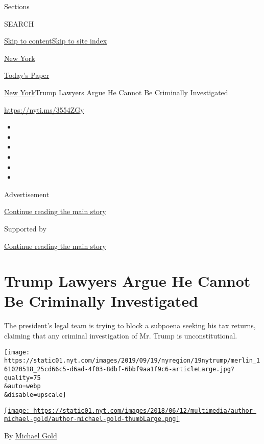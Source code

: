 Sections

SEARCH

\protect\hyperlink{site-content}{Skip to
content}\protect\hyperlink{site-index}{Skip to site index}

\href{https://www.nytimes.com/section/nyregion}{New York}

\href{https://myaccount.nytimes.com/auth/login?response_type=cookie\&client_id=vi}{}

\href{https://www.nytimes.com/section/todayspaper}{Today's Paper}

\href{/section/nyregion}{New York}\textbar{}Trump Lawyers Argue He
Cannot Be Criminally Investigated

\url{https://nyti.ms/3554ZGy}

\begin{itemize}
\item
\item
\item
\item
\item
\item
\end{itemize}

Advertisement

\protect\hyperlink{after-top}{Continue reading the main story}

Supported by

\protect\hyperlink{after-sponsor}{Continue reading the main story}

\hypertarget{trump-lawyers-argue-he-cannot-be-criminally-investigated}{%
\section{Trump Lawyers Argue He Cannot Be Criminally
Investigated}\label{trump-lawyers-argue-he-cannot-be-criminally-investigated}}

The president's legal team is trying to block a subpoena seeking his tax
returns, claiming that any criminal investigation of Mr. Trump is
unconstitutional.

\texttt{[image: https://static01.nyt.com/images/2019/09/19/nyregion/19nytrump/merlin\_161020518\_25cd66c5-d6ad-4f03-8dbf-6bbf9aa1f9c6-articleLarge.jpg?quality=75\\\&auto=webp\\\&disable=upscale]}

\href{https://www.nytimes.com/by/michael-gold}{\texttt{[image: https://static01.nyt.com/images/2018/06/12/multimedia/author-michael-gold/author-michael-gold-thumbLarge.png]}}

By \href{https://www.nytimes.com/by/michael-gold}{Michael Gold}

